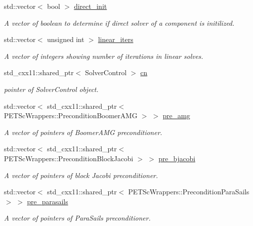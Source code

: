 \begin{DoxyCompactItemize}
std\+::vector$<$ bool $>$ \hyperlink{class_preconditioner_solver_a0241f0b26a8c964fc1e3fd8fef5a20a6}{direct\+\_\+init}
\begin{DoxyCompactList}\small\item\em A vector of boolean to determine if direct solver of a component is initilized. \end{DoxyCompactList}\item 
std\+::vector$<$ unsigned int $>$ \hyperlink{class_preconditioner_solver_a09b25f234ad6a225fb8a002fc919181a}{linear\+\_\+iters}
\begin{DoxyCompactList}\small\item\em A vector of integers showing number of iterations in linear solves. \end{DoxyCompactList}\item 
std\+\_\+cxx11\+::shared\+\_\+ptr$<$ Solver\+Control $>$ \hyperlink{class_preconditioner_solver_a3170128a1c287f729fa40c9aff2f2eed}{cn}
\begin{DoxyCompactList}\small\item\em pointer of Solver\+Control object. \end{DoxyCompactList}\item 
std\+::vector$<$ std\+\_\+cxx11\+::shared\+\_\+ptr$<$ P\+E\+T\+Sc\+Wrappers\+::\+Precondition\+Boomer\+A\+MG $>$ $>$ \hyperlink{class_preconditioner_solver_a235b12fcd8e5978c1a3df8c76d05808b}{pre\+\_\+amg}
\begin{DoxyCompactList}\small\item\em A vector of pointers of Boomer\+A\+MG preconditioner. \end{DoxyCompactList}\item 
std\+::vector$<$ std\+\_\+cxx11\+::shared\+\_\+ptr$<$ P\+E\+T\+Sc\+Wrappers\+::\+Precondition\+Block\+Jacobi $>$ $>$ \hyperlink{class_preconditioner_solver_af3d0217e39b9527c67ac6ce56464f11a}{pre\+\_\+bjacobi}
\begin{DoxyCompactList}\small\item\em A vector of pointers of block Jacobi preconditioner. \end{DoxyCompactList}\item 
std\+::vector$<$ std\+\_\+cxx11\+::shared\+\_\+ptr$<$ P\+E\+T\+Sc\+Wrappers\+::\+Precondition\+Para\+Sails $>$ $>$ \hyperlink{class_preconditioner_solver_a90b15442f60786b56729f2756e191336}{pre\+\_\+parasails}
\begin{DoxyCompactList}\small\item\em A vector of pointers of Para\+Sails preconditioner. \end{DoxyCompactList}\item 

\end{DoxyCompactItemize}
